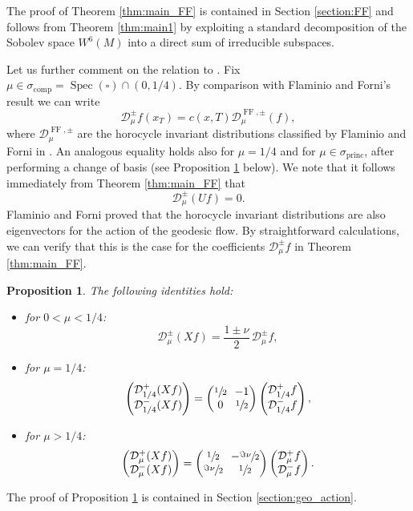 \documentclass[11pt]{article}
\newcommand{\Dp}[1]{\mathcal{D}_\mu^{+} #1}
\newcommand{\Dm}[1]{\mathcal{D}_\mu^{-} #1}
\newcommand{\Dpm}[1]{\mathcal{D}_\mu^{\pm} #1}
\newcommand{\Dpmp}[1]{\mathcal{D}_\mu^{\pm}(#1)}
\DeclareMathOperator{\Spec}{Spec}
\DeclareMathOperator{\comp}{comp}
\DeclareMathOperator{\princ}{princ}
\DeclareMathOperator{\FF}{FF}
\newtheorem {proposition}[theorem]{Proposition}
\theoremstyle{definition}
\begin{document}
The proof of Theorem \ref{thm:main_FF} is contained in Section \ref{section:FF} and follows from Theorem \ref{thm:main1} by exploiting a standard decomposition of the Sobolev space $W^6(M)$ into a direct sum of irreducible subspaces.

Let us further comment on the relation to \cite[Th.\,1.5]{FlaFo}. Fix $\mu \in \sigma_{\comp} = \Spec(\square) \cap (0,1/4)$.
By comparison with Flaminio and Forni's result we can write
\[
\Dpm{f}(x_T) = c(x,T) \mathcal{D}^{\FF, \pm}_\mu (f),
\]
where $\mathcal{D}^{\FF, \pm}_\mu$ are the horocycle invariant distributions classified by Flaminio and Forni in \cite{FlaFo}.
An analogous equality holds also for $\mu = 1/4$ and for $\mu \in \sigma_{\princ}$, after performing a change of basis (see Proposition \ref{thm:eigenvectors} below). We note that it follows immediately from Theorem \ref{thm:main_FF} that
\[
\Dpmp{Uf} =0.
\]
Flaminio and Forni proved that the horocycle invariant distributions are also eigenvectors for the action of the geodesic flow. By straightforward calculations, we can verify that this is the case for the coefficients $\Dpm{f}$ in Theorem \ref{thm:main_FF}.

\begin{proposition}\label{thm:eigenvectors}
The following identities hold:
\begin{itemize}
\item for $0<\mu< 1/4$:
\[
\Dpmp{Xf} = \frac{1\pm \nu}{2}\, \Dpm{f},
\]
\item for $\mu=1/4$:
\[\arraycolsep3.5pt
\begin{pmatrix}
\mathcal{D}^{+}_{1/4}(Xf) \\
\mathcal{D}^{-}_{1/4}(Xf)
\end{pmatrix}
=
\begin{pmatrix}
\sfrac{1}{2} & -1 \\
0 & \sfrac{1}{2}
\end{pmatrix}
\begin{pmatrix}
\mathcal{D}^{+}_{1/4}f \\
\mathcal{D}^{-}_{1/4}f
\end{pmatrix},
\]
\item for $\mu > 1/4$:
\[\arraycolsep3.5pt
\begin{pmatrix}
\Dp{(Xf)} \\
\Dm{(Xf)}
\end{pmatrix}
=
\begin{pmatrix}
\sfrac{1}{2} & -\sfrac{\Im \nu}{2} \\
\sfrac{\Im \nu}{2} & \sfrac{1}{2}
\end{pmatrix}
\begin{pmatrix}
\Dp{f} \\
\Dm{f}
\end{pmatrix}.
\]
\end{itemize}
\end{proposition}
The proof of Proposition \ref{thm:eigenvectors} is contained in Section \ref{section:geo_action}.
\end{document}
